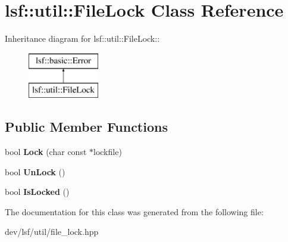 \hypertarget{classlsf_1_1util_1_1FileLock}{
\section{lsf::util::FileLock Class Reference}
\label{classlsf_1_1util_1_1FileLock}
}
Inheritance diagram for lsf::util::FileLock::\begin{figure}[H]
\begin{center}
\leavevmode
\includegraphics[height=2cm]{classlsf_1_1util_1_1FileLock}
\end{center}
\end{figure}
\subsection*{Public Member Functions}
\begin{DoxyCompactItemize}
\item 
\hypertarget{classlsf_1_1util_1_1FileLock_a4748fbc4b705d960f020f909c5e7a648}{
bool {\bfseries Lock} (char const $\ast$lockfile)}
\label{classlsf_1_1util_1_1FileLock_a4748fbc4b705d960f020f909c5e7a648}

\item 
\hypertarget{classlsf_1_1util_1_1FileLock_aa41e261e94e65724e58474c74ec7bf9a}{
bool {\bfseries UnLock} ()}
\label{classlsf_1_1util_1_1FileLock_aa41e261e94e65724e58474c74ec7bf9a}

\item 
\hypertarget{classlsf_1_1util_1_1FileLock_a930cbfcfe878e1e8b89b22b45d281327}{
bool {\bfseries IsLocked} ()}
\label{classlsf_1_1util_1_1FileLock_a930cbfcfe878e1e8b89b22b45d281327}

\end{DoxyCompactItemize}


The documentation for this class was generated from the following file:\begin{DoxyCompactItemize}
\item 
dev/lsf/util/file\_\-lock.hpp\end{DoxyCompactItemize}
